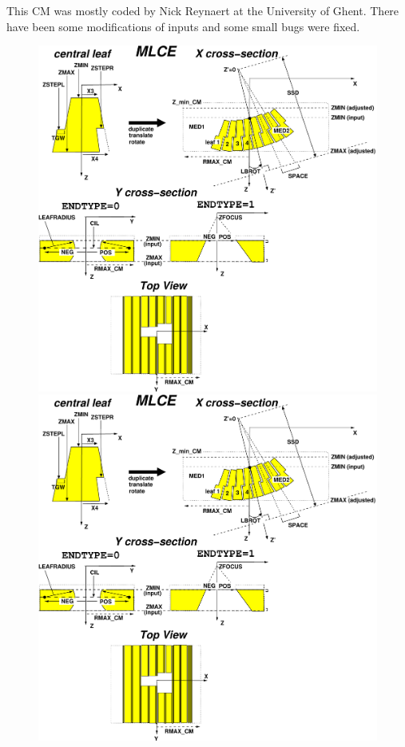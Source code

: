 \documentclass[12pt,twoside]{article}
\begin{document}
This CM was mostly coded by Nick Reynaert at the University of Ghent.
There have been some modifications of inputs and some small bugs were
fixed.

\begin{figure}[htpb]
\begin{center}
\leavevmode
\begin{latexonly}
\includegraphics[width=18.5cm]{figures/mlced}
\end{latexonly}
\begin{htmlonly}
\includegraphics[width=13cm]{figures/mlced}

\end{htmlonly}
\end{center}
\end{figure}
\end{document}
